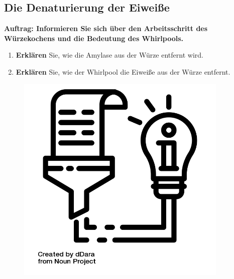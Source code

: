 \documentclass{scrartcl}  %
\begin{document}
\newpage
		\subsection{Die Denaturierung der Eiweiße}
			\textbf{Auftrag: Informieren Sie sich über den Arbeitsschritt des Würzekochens und die Bedeutung des Whirlpools.}
			\begin{enumerate}
				\item \textbf{Erklären} Sie, wie die Amylase aus der Würze entfernt wird.
				\item \textbf{Erklären} Sie, wie der Whirlpool die Eiweiße aus der Würze entfernt.
			\end{enumerate}

\vspace{0.3cm}
			\begin{tcolorbox}[enhanced,
				colback=white,
				colframe=darkgray,
				fonttitle=\sffamily\bfseries\large, 
				title=Das Würzekochen,  %
				attach boxed title to top left={xshift=3.2mm,yshift=-0.50mm},
				boxed title style={skin=enhancedfirst jigsaw,size=small,arc=1mm,bottom=-1mm,colframe=darkgray,height=0.75cm},
				colbacktitle=darkgray,
				drop lifted shadow]
				\begin{figure}  
					\centering
					\vspace{-14pt}  %
					\includegraphics[width=0.9\textwidth]{symbols/symbol_tex_content}
				\end{figure}
				

\end{tcolorbox}
\end{document}
